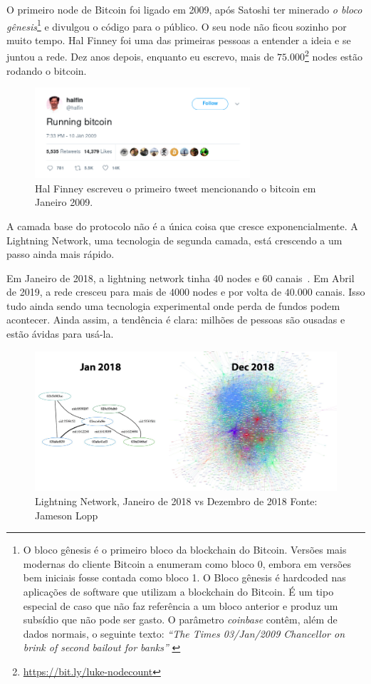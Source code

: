 O primeiro node de Bitcoin foi ligado em 2009, após Satoshi ter minerado \textit{o bloco gênesis}\footnote{O bloco gênesis é o primeiro bloco da blockchain do Bitcoin. Versões mais modernas do cliente Bitcoin a enumeram como bloco $0$, embora em versões bem iniciais fosse contada como bloco 1. O Bloco gênesis é hardcoded nas aplicações de software que utilizam a blockchain do Bitcoin. É um tipo especial de caso que não faz referência a um bloco anterior e produz um subsídio que não pode ser gasto. O parâmetro \textit{coinbase} contêm, além de dados normais, o seguinte texto: \textit{\enquote{The Times 03/Jan/2009 Chancellor on brink of second bailout for banks}} \cite{btcwiki:genesis-block}} e divulgou o código para o público. O seu node não ficou sozinho por muito tempo. Hal Finney foi uma das primeiras pessoas a entender a ideia e se juntou a rede. Dez anos depois, enquanto eu escrevo, mais de $75.000$\footnote{\url{https://bit.ly/luke-nodecount}} nodes estão rodando o bitcoin.

\begin{figure}
  \centering
  \includegraphics[width=8cm]{assets/images/running-bitcoin.png}
  \caption{Hal Finney escreveu o primeiro tweet mencionando o bitcoin em Janeiro 2009.}
  \label{fig:running-bitcoin}
\end{figure}

A camada base do protocolo não é a única coisa que cresce exponencialmente. A Lightning Network, uma tecnologia de segunda camada, está crescendo a um passo ainda mais rápido.

Em Janeiro de 2018, a lightning network tinha $40$ nodes e $60$ canais~\cite{web:lightning-nodes}.
Em Abril de 2019, a rede cresceu para mais de $4000$ nodes e por volta de $40.000$ canais. Isso tudo ainda sendo uma tecnologia experimental onde perda de fundos podem acontecer. Ainda assim, a tendência é clara: milhões de pessoas são ousadas e estão ávidas para usá-la.

\begin{figure}
  \includegraphics{assets/images/lnd-growth-lopp-white.png}
  \caption{Lightning Network, Janeiro de 2018 vs Dezembro de 2018 Fonte: Jameson Lopp}
  \label{fig:lnd-growth-lopp-white.png}
\end{figure}

